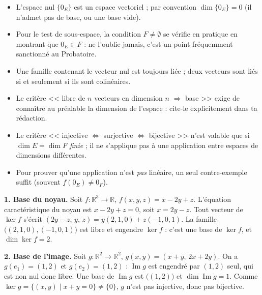 \documentclass[11pt]{article}
\begin{document}
\begin{attention}
\begin{itemize}
  \item L'espace nul $\{0_E\}$ est un espace vectoriel ; par convention $\dim\{0_E\}=0$ (il n'admet pas de base, ou une base vide).
  \item Pour le test de sous-espace, la condition $F\neq\emptyset$ se v\'erifie en pratique en montrant que $0_E\in F$ : ne l'oublie jamais, c'est un point fr\'equemment sanctionn\'e au Probatoire.
  \item Une famille contenant le vecteur nul est toujours li\'ee ; deux vecteurs sont li\'es si et seulement si ils sont colin\'eaires.
  \item Le crit\`ere << libre de $n$ vecteurs en dimension $n$ $\Rightarrow$ base >> exige de conna\^itre au pr\'ealable la dimension de l'espace : cite-le explicitement dans ta r\'edaction.
  \item Le crit\`ere << injective $\iff$ surjective $\iff$ bijective >> n'est valable que si $\dim E=\dim F$ \emph{finie} ; il ne s'applique pas \`a une application entre espaces de dimensions diff\'erentes.
  \item Pour prouver qu'une application n'est \emph{pas} lin\'eaire, un seul contre-exemple suffit (souvent $f(0_E)\neq 0_F$).
\end{itemize}
\end{attention}

\begin{exemplebox}
\textbf{1. Base du noyau.} Soit $f:\mathbb{R}^3\to\mathbb{R}$, $f(x,y,z)=x-2y+z$. L'\'equation caract\'eristique du noyau est $x-2y+z=0$, soit $x=2y-z$. Tout vecteur de $\ker f$ s'\'ecrit $(2y-z,\,y,\,z)=y(2,1,0)+z(-1,0,1)$. La famille $\big((2,1,0),(-1,0,1)\big)$ est libre et engendre $\ker f$ : c'est une base de $\ker f$, et $\dim\ker f=2$.

\textbf{2. Base de l'image.} Soit $g:\mathbb{R}^2\to\mathbb{R}^2$, $g(x,y)=(x+y,\,2x+2y)$. On a $g(e_1)=(1,2)$ et $g(e_2)=(1,2)$ : $\operatorname{Im}g$ est engendr\'e par $(1,2)$ seul, qui est non nul donc libre. Une base de $\operatorname{Im}g$ est $\big((1,2)\big)$ et $\dim\operatorname{Im}g=1$. Comme $\ker g=\{(x,y)\mid x+y=0\}\neq\{0\}$, $g$ n'est pas injective, donc pas bijective.
\end{exemplebox}
\end{document}
